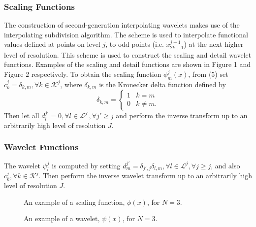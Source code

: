 \documentclass[10.5pt]{article}
\begin{document}
\subsubsection*{Scaling Functions}
The construction of second-generation interpolating wavelets makes use of the interpolating subdivision algorithm. 
The scheme is used to interpolate functional values defined at points on level $j$, to odd points (i.e. $x_{2k+1}^{j+1}$) 
at the next higher level of resolution. This scheme is used to construct the scaling and detail wavelet functions. 
Examples of the scaling and detail functions are shown in Figure 1 and Figure 2 respectively.
To obtain the scaling function $\phi_{m}^{j}(x)$, from (5) set $c_{k}^{j}=\delta_{k,m}, \forall k \in \mathcal{K}^j$, where $\delta_{k,m}$ is the Kronecker delta function defined by
\[ \delta_{k,m} = \begin{cases} 
      1 & k=m \\
      0 & k \neq m.
   \end{cases}
\]
Then let all $d_{l}^{j'}=0, \forall l \in \mathcal{L}^{j'}, \forall j' \geq j$ and perform the inverse transform 
up to an arbitrarily high level of resolution $J$. 

\subsubsection*{Wavelet Functions}
The wavelet $\psi_{l}^{j}$ is computed by setting $d_{m}^{j'} = \delta_{j',j} \delta_{l,m}, 
\forall l \in \mathcal{L}^{j}, \forall j \geq j$, 
and also $c_{k}^{j}, \forall k \in \mathcal{K}^j$. Then perform the inverse wavelet transform up to an 
arbitrarily high level of resolution $J$.
\begin{figure}
	\center
	
	\caption{An example of a scaling function, $\phi(x)$, for $N=3$.}
\end{figure}
\begin{figure}
	\center
	
	\caption{An example of a wavelet, $\psi(x)$, for $N=3$.}
\end{figure}
\end{document}
